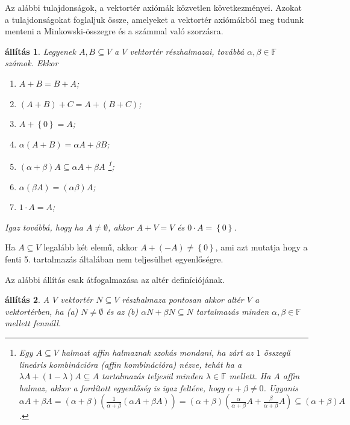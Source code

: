 \documentclass[9pt, showtrims]{memoir}
\theoremstyle{plain}
\newtheorem{proposition}{állítás}[section]
\theoremstyle{remark}
\theoremstyle{definition}
\renewcommand{\mathbf}{\mathbb}
\begin{document}
Az alábbi tulajdonságok, a vektortér axiómák közvetlen következményei.
Azokat a tulajdonságokat foglaljuk össze, amelyeket a vektortér axiómákból meg tudunk menteni
a Minkowski-összegre és a számmal való szorzásra.
\begin{proposition}\label{pr:Minkowski}
    Legyenek $A,B\subseteq V$ a $V$ vektortér részhalmazai,
    továbbá $\alpha,\beta\in\mathbf{F}$ számok.
    Ekkor 
    \begin{enumerate}
        \item $A+B=B+A$;
        \item $\left( A+B \right)+C=A+\left( B+C \right)$;
        \item $A+\left\{ 0 \right\}=A$;
        \item $\alpha\left( A+B \right)=\alpha A+\beta B$;
        \item $\left( \alpha+\beta \right) A\subseteq \alpha A+\beta A$%
            \footnote{
                Egy $A\subseteq V$ halmazt \emph{affin halmaznak}
                szokás mondani, 
                ha zárt az $1$ összegű lineáris kombinációra 
                (\emph{affin kombinációra})
                nézve, 
                tehát ha a $\lambda A+\left( 1-\lambda \right)A\subseteq A$ 
                tartalmazás teljesül minden $\lambda\in\mathbf{F}$
                mellett.
                Ha $A$ affin halmaz, 
                akkor a fordított egyenlőség is igaz feltéve, hogy $\alpha+\beta\neq 0$.
                Ugyanis
                $\alpha A+\beta A
                =
                \left( \alpha+\beta \right)\left( \frac{1}{\alpha+\beta}\left( \alpha A+\beta A \right) \right)
                =
                \left( \alpha+\beta \right)\left( \frac{\alpha}{\alpha+\beta}A+\frac{\beta}{\alpha+\beta}A \right)
                \subseteq 
                \left( \alpha+\beta \right)A$.
            };
        \item $\alpha\left( \beta A \right)=\left( \alpha\beta \right)A$;
        \item $1\cdot A=A$;
    \end{enumerate}
    Igaz továbbá, hogy ha $A\neq \emptyset$, akkor $A+V=V$ és $0\cdot A=\left\{ 0 \right\}$.
\end{proposition}
Ha $A\subseteq V$ legalább két elemű, 
akkor $A+\left( -A \right)\neq\left\{ 0 \right\}$, ami azt mutatja hogy a fenti 5. tartalmazás
általában nem teljesülhet egyenlőségre.

Az alábbi állítás csak átfogalmazása az altér definíciójának.
\begin{proposition}
    A $V$ vektortér $N\subseteq V$ részhalmaza pontosan akkor altér $V$ a vektortérben,
    ha 
    (a) $N\neq \emptyset$ és az 
    (b) $\alpha N+\beta N\subseteq N$ tartalmazás minden $\alpha,\beta\in\mathbf{F}$
    mellett fennáll.
\end{proposition}
\end{document}
